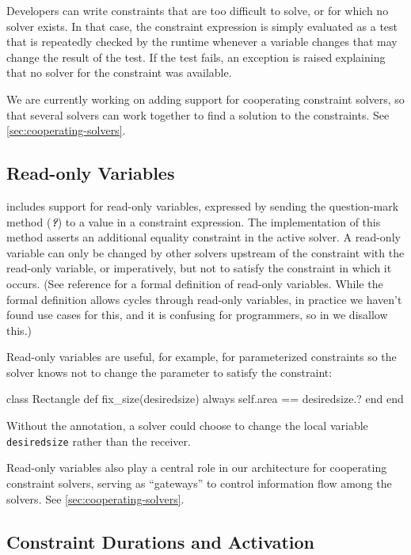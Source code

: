 Developers can write constraints that are too
difficult to solve, or for which no solver exists. In that case, the
constraint expression is simply evaluated as a test that is repeatedly
checked by the runtime whenever a variable changes that may change the
result of the test. If the test fails, an exception is raised
explaining that no solver for the constraint was available.

We are currently working on adding support for cooperating constraint
solvers, so that several solvers can work together to find a solution
to the constraints.  See \autoref{sec:cooperating-solvers}.

\subsection{Read-only Variables}

\langname includes support for read-only variables, expressed by
sending the question-mark method ({\bfseries\emph{?}}) to a value in a
constraint expression. The implementation of this method asserts an
additional equality constraint in the active solver. A read-only
variable can only be changed by other solvers upstream of the
constraint with the read-only variable, or imperatively, but not to
satisfy the constraint in which it occurs. (See reference
\cite{borning-lisp-symbolic-computation-1992} for a formal definition
of read-only variables.  While the formal definition allows cycles
through read-only variables, in practice we haven't found use cases
for this, and it is confusing for programmers, so in \langname we
disallow this.)

Read-only variables are useful, for example, for parameterized
constraints so the solver knows not to change the parameter to satisfy
the constraint:
\begin{code}
class Rectangle
  def fix_size(desiredsize)
    always { self.area == desiredsize.? }
  end
end
\end{code}

Without the annotation, a solver could choose to change the local
variable \lstinline{desiredsize} rather than the receiver.

Read-only variables also play a central role in our architecture for
cooperating constraint solvers, serving as ``gateways'' to control
information flow among the solvers.  See
\autoref{sec:cooperating-solvers}.

\subsection{Constraint Durations and Activation}
\label{sec:constraint-durations-and-activation}

